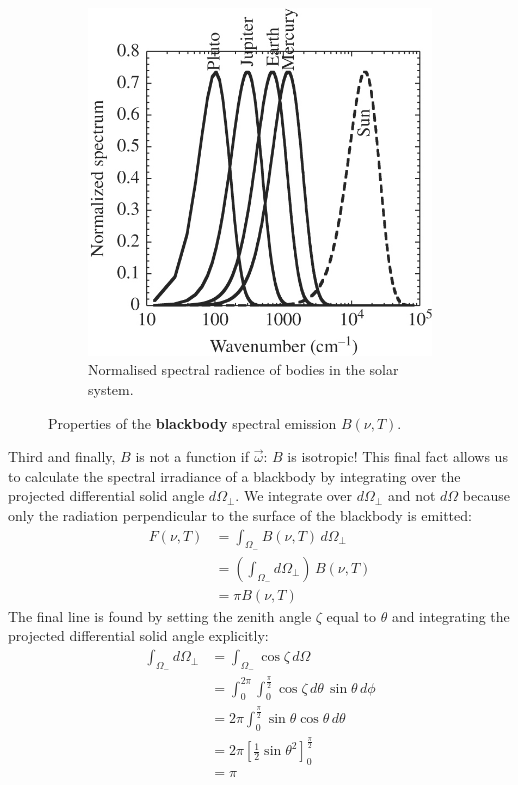 \begin{figure}[H]
\begin{subfigure}{0.25\linewidth}
        \includegraphics[width=\linewidth]{Figures/Radiative Transfer/Spectral Gap.jpg}
        \caption{Normalised spectral radience of bodies in the solar system.}
        \label{Spec Gap BB}
    \end{subfigure}
    \caption{Properties of the \textbf{blackbody} spectral emission $B(\nu,T)$.}
\end{figure}

Third and finally, $B$ is not a function if $\vec{\omega}$: $B$ is isotropic! This final fact allows us to calculate the spectral irradiance of a blackbody by integrating over the projected differential solid angle $d\Omega_\perp$. We integrate over $d\Omega_\perp$ and not  $d\Omega$ because only the radiation perpendicular to the surface of the blackbody is emitted:
\begin{align*}
    F(\nu,T)&=\int_{\Omega_-} B(\nu,T)\,d\Omega_\perp\\
    &= \left( \int_{\Omega_-}d\Omega_{\perp} \right)\,B(\nu,T)\\
    &=\pi B(\nu,T)
\end{align*}
The final line is found by setting the zenith angle $\zeta$ equal to $\theta$ and integrating the projected differential solid angle explicitly:
\begin{align*}
    \int_{\Omega_-}d\Omega_\perp&=\int_{\Omega_-} \cos \zeta \,d\Omega\\
    &=\int_{0}^{2\pi}\int_{0}^{\frac{\pi}{2}} \cos \zeta \,d\theta \,\sin\theta \,d\phi\\
    &=2\pi \int_{0}^{\frac{\pi}{2}}\sin\theta\cos\theta\,d\theta\\
    &=2\pi\left[ \frac{1}{2}\sin\theta^2 \right]_0^{\frac{\pi}{2}}\\
    &=\pi
\end{align*}


